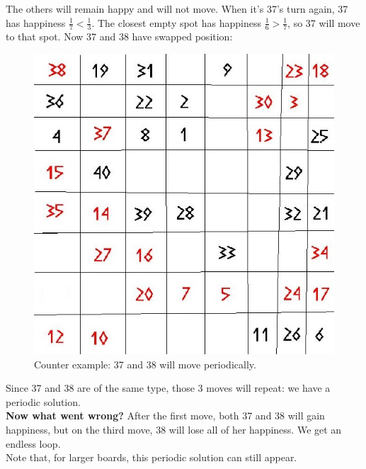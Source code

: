 \documentclass{article}
\begin{document}
\newpage
The others will remain happy and will not move. When it's 37's turn again, 37 has happiness $\frac{1}{7} < \frac{1}{3}$. The closest empty spot has happiness $\frac{1}{6} > \frac{1}{7}$, so 37 will move to that spot. Now 37 and 38 have swapped position:\\
\begin{figure}[h!]
\begin{center}
\includegraphics[scale=0.25]{segregation_tegenvb_3.jpg}
\end{center}
\caption{Counter example: 37 and 38 will move periodically.}\label{counterexample3}
\end{figure}
Since 37 and 38 are of the same type, those 3 moves will repeat: we have a periodic solution.\\
\textbf{Now what went wrong?} After the first move, both 37 and 38 will gain happiness, but on the third move, 38 will lose all of her happiness. We get an endless loop.\\
Note that, for larger boards, this periodic solution can still appear.
\end{document}
